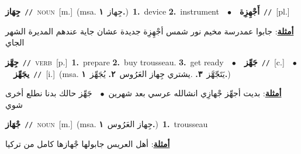 \documentclass[10pt,a4paper,twoside]{article} %
\begin{document}
\begin{multicols}{2}
{\setlength\topsep{0pt}\textbf{\foreignlanguage{arabic}{جِهَاز}}\ {\color{gray}\texttt{//}\color{black}}\ \textsc{noun}\ [m.]\ \color{gray}(msa. \foreignlanguage{arabic}{جِهاز}~\foreignlanguage{arabic}{\textbf{١.}})\color{black}\ \textbf{1.}~device  \textbf{2.}~instrument\ \ $\bullet$\ \ \setlength\topsep{0pt}\textbf{\foreignlanguage{arabic}{أَجْهِزِة}}\ {\color{gray}\texttt{//}\color{black}}\ [pl.]\  \begin{flushright}\color{gray}\foreignlanguage{arabic}{\textbf{\underline{\foreignlanguage{arabic}{أمثلة}}}: جابوا عمدرسة مخيم نور شمس أجْهِزِة جديدة عشان جاية عندهم المديرة الشهر الجاي}\end{flushright}\color{black}} \vspace{2mm}

{\setlength\topsep{0pt}\textbf{\foreignlanguage{arabic}{جِهَّز}}\ {\color{gray}\texttt{//}\color{black}}\ \textsc{verb}\ [p.]\ \textbf{1.}~prepare  \textbf{2.}~buy trousseau.  \textbf{3.}~get ready\ \ $\bullet$\ \ \setlength\topsep{0pt}\textbf{\foreignlanguage{arabic}{جَهِّز}}\ {\color{gray}\texttt{//}\color{black}}\ [c.]\ \ $\bullet$\ \ \setlength\topsep{0pt}\textbf{\foreignlanguage{arabic}{يجَهِّز}}\ {\color{gray}\texttt{//}\color{black}}\ [i.]\ \color{gray}(msa. \foreignlanguage{arabic}{يَتَجّهَّز}~\foreignlanguage{arabic}{\textbf{٣.}}  .\foreignlanguage{arabic}{يشتري جِهاز العَرُوس}~\foreignlanguage{arabic}{\textbf{٢.}}  \foreignlanguage{arabic}{يُجَهِّز}~\foreignlanguage{arabic}{\textbf{١.}})\color{black}\  \begin{flushright}\color{gray}\foreignlanguage{arabic}{\textbf{\underline{\foreignlanguage{arabic}{أمثلة}}}: بديت أجهِّز جْهازِي انشالله عرسي بعد شهرين\ $\bullet$\ \  جَهِّز حالك بدنا نطلع أخرى شوي}\end{flushright}\color{black}} \vspace{2mm}

{\setlength\topsep{0pt}\textbf{\foreignlanguage{arabic}{جْهَاز}}\ {\color{gray}\texttt{//}\color{black}}\ \textsc{noun}\ [m.]\ \color{gray}(msa. \foreignlanguage{arabic}{جِهاز العَرُوس}~\foreignlanguage{arabic}{\textbf{١.}})\color{black}\ \textbf{1.}~trousseau\  \begin{flushright}\color{gray}\foreignlanguage{arabic}{\textbf{\underline{\foreignlanguage{arabic}{أمثلة}}}: أهل العريس جابولها جْهازها كامل من تركيا}\end{flushright}\color{black}} \vspace{2mm}


\end{multicols}
\end{document}

